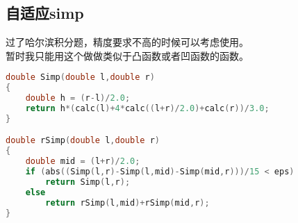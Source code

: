 \subsection{自适应simp}
	过了哈尔滨积分题，精度要求不高的时候可以考虑使用。\\
	暂时我只能用这个做做类似于凸函数或者凹函数的函数。
	\begin{lstlisting}[language=c++]
double Simp(double l,double r)
{
	double h = (r-l)/2.0;
	return h*(calc(l)+4*calc((l+r)/2.0)+calc(r))/3.0;
}

double rSimp(double l,double r)
{
	double mid = (l+r)/2.0;
	if (abs((Simp(l,r)-Simp(l,mid)-Simp(mid,r)))/15 < eps)
		return Simp(l,r);
	else
		return rSimp(l,mid)+rSimp(mid,r);
}
	\end{lstlisting}
